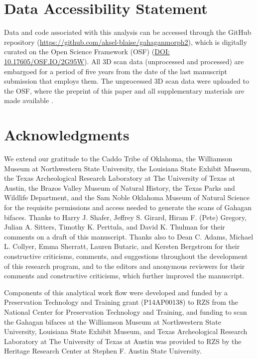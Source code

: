 \documentclass[review]{elsarticle}
\begin{document}
\section*{Data Accessibility Statement}

Data and code associated with this analysis can be accessed through the GitHub repository (\href{https://github.com/aksel-blaise/gahaganmorph2}{https://github.com/aksel-blaise/gahaganmorph2}), which is digitally curated on the Open Science Framework (OSF) (\href{https://osf.io/2g95w/}{DOI: 10.17605/OSF.IO/2G95W}). All 3D scan data (unprocessed and processed) are embargoed for a period of five years from the date of the last manuscript submission that employs them. The unprocessed 3D scan data were uploaded to the OSF, where the preprint of this paper and all supplementary materials are made available \citep{RN20850}.

\section*{Acknowledgments}

We extend our gratitude to the Caddo Tribe of Oklahoma, the Williamson Museum at Northwestern State University, the Louisiana State Exhibit Museum, the Texas Archeological Research Laboratory at The University of Texas at Austin, the Brazos Valley Museum of Natural History, the Texas Parks and Wildlife Department, and the Sam Noble Oklahoma Museum of Natural Science for the requisite permissions and access needed to generate the scans of Gahagan bifaces. Thanks to Harry J. Shafer, Jeffrey S. Girard, Hiram F. (Pete) Gregory, Julian A. Sitters, Timothy K. Perttula, and David K. Thulman for their comments on a draft of this manuscript. Thanks also to Dean C. Adams, Michael L. Collyer, Emma Sherratt, Lauren Butaric, and Kersten Bergstrom for their constructive criticisms, comments, and suggestions throughout the development of this research program, and to the editors and anonymous reviewers for their comments and constructive criticisms, which further improved the manuscript.

Components of this analytical work flow were developed and funded by a Preservation Technology and Training grant (P14AP00138) to RZS from the National Center for Preservation Technology and Training, and funding to scan the Gahagan bifaces at the Williamson Museum at Northwestern State University, Louisiana State Exhibit Museum, and Texas Archeological Research Laboratory at The University of Texas at Austin was provided to RZS by the Heritage Research Center at Stephen F. Austin State University.


\end{document}

